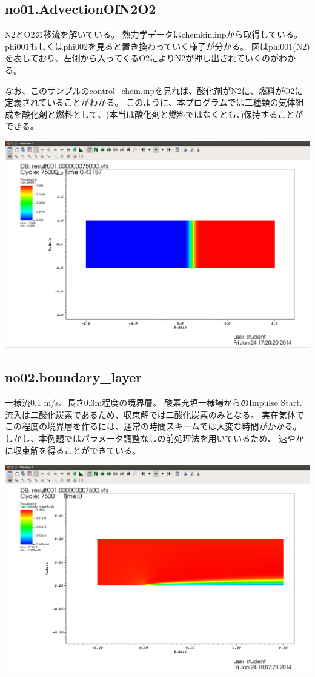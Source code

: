 \documentclass{jsarticle}
\begin{document}
\subsection{no01.AdvectionOfN2O2}%
N2とO2の移流を解いている。
熱力学データはchemkin.inpから取得している。
phi001もしくはphi002を見ると置き換わっていく様子が分かる。
図はphi001(N2)を表しており、左側から入ってくるO2によりN2が押し出されていくのがわかる。

なお、このサンプルのcontrol\_chem.inpを見れば、酸化剤がN2に、燃料がO2に定義されていることがわかる。
このように、本プログラムでは二種類の気体組成を酸化剤と燃料として、(本当は酸化剤と燃料ではなくとも、)保持することができる。
\begin{center}
\includegraphics[width=.6\textwidth,bb=0 0 1556 1054]{sample/no01.png}
\end{center}
\subsection{no02.boundary\_layer}%
一様流0.1 m/s、長さ0.3m程度の境界層。
酸素充填一様場からのImpulse Start.
流入は二酸化炭素であるため、収束解では二酸化炭素のみとなる。
実在気体でこの程度の境界層を作るには、通常の時間スキームでは大変な時間がかかる。
しかし、本例題ではパラメータ調整なしの前処理法を用いているため、
速やかに収束解を得ることができている。
\begin{center}
\includegraphics[width=.7\textwidth,bb=0 0 1556 1054]{sample/no02.png}
\end{center}
\end{document}
